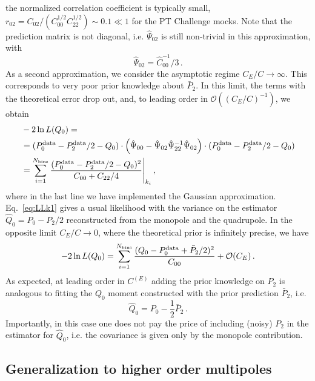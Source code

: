 \documentclass[12pt,a4paper]{article}
\newcommand{\be}{\begin{equation}}
\newcommand{\ee}{\end{equation}}
\renewcommand{\ln}{\mathop{\rm ln}\nolimits}
\begin{document}
the normalized correlation coefficient is typically small,
$r_{02}=C_{02}/(C^{1/2}_{00}C^{1/2}_{22})\sim 0.1\ll 1$ for the PT Challenge mocks.
Note that the prediction matrix is not diagonal, i.e.
$\hat \Psi_{02}$ is still non-trivial in this approximation, with
\be
 \hat \Psi_{02} = \hat{C}_{00}^{-1}/3\,.
\ee
As a second approximation, we consider the asymptotic regime $C_E/C \to \infty$. This corresponds to very poor prior knowledge about $\bar P_2$. In this limit, the terms with the theoretical error drop out, and, to leading order in $\mathcal{O}((C_{E}/C)^{-1})$, we obtain
\be 
\label{eq:LLk1}
\begin{split}
&-2\ln L(Q_0)=\\
&=(P^{\rm data}_{0}-P^{\rm data}_{2}/2 - Q_{0})\cdot 
\left(\hat{\Psi}_{00} -\hat{\Psi}_{02} \hat{\Psi}_{22}^{-1}\hat{\Psi}_{02}\right)\cdot (P^{\rm data}_{0}-P^{\rm data}_{2}/2 - Q_{0})\\
&=\sum_{i=1}^{N_{\rm bins}}\frac{(P^{\rm data}_{0}-P^{\rm data}_{2}/2 - Q_{0})^2}{C_{00}+C_{22}/4}\Bigg|_{k_i}
\,,
\end{split}
\ee
where in the last line we have implemented the Gaussian approximation.
Eq.~\eqref{eq:LLk1} gives a usual likelihood with the variance on the estimator $\hat Q_0 = P_0-P_2/2$ reconstructed from the monopole and the quadrupole.
In the opposite limit $C_E/C \to 0$, where the theoretical prior 
is infinitely precise, we have
\be 
-2\ln L (Q_0)=
\sum_{i=1}^{N_{\rm bins}}\frac{( Q_{0} - P^{\rm data}_{0}+\bar P_{2}/2 )^2}{C_{00}}
 + \mathcal{O}(C_E)\,.
\ee 
As expected, at leading order in $C^{(E)}$ adding the prior knowledge on $P_2$ is analogous to fitting the $Q_0$
moment constructed with the prior prediction $\bar P_2$, i.e. 
\be
\hat Q_{0}  = P_0 -\frac{1}{2}\bar P_2\,.
\ee
Importantly, in this case one does not pay the price of including (noisy)
$P_2$ in the estimator for $\hat Q_{0} $, i.e. 
the covariance is given only by the monopole contribution.

\subsection{Generalization to higher order multipoles}
\end{document}
